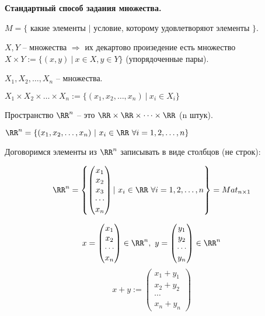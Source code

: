 \bigskip
\textbf{Стандартный способ задания множества.}

\bigskip
$M = \{$ какие элементы $|$ условие, которому удовлетворяют элементы $\}$.

\bigskip
$X, Y$ -- множества $\Rightarrow$ их декартово произедение есть множество $X \times Y := \{ (x, y) \ | \ x \in X, y \in Y\}$ (упорядоченные пары).

$X_1, X_2, \dots, X_n$ -- множества.

$X_1 \times X_2 \times \dots \times X_n := \{(x_1, x_2, \dots, x_n) \ | \ x_i \in X_i\}$

Пространство $\RR^n$ -- это $\RR \times \RR \times \cdots \times \RR$ (n штук).

$\RR^n = \{ (x_1, x_2, \dots, x_n) \ | \ x_i \in \RR \  \forall i = 1, 2, \dots, n \}$

\bigskip
Договоримся элементы из $\RR^n$ записывать в виде столбцов (не строк):

\begin{equation*} \RR^n = \left\{ \begin{pmatrix}
    x_1 \\
    x_2 \\
    x_3 \\
    \cdots \\
    x_n
	\end{pmatrix} | \ x_i \in \RR \ \forall i = 1, 2, \dots , n \right\} = Mat_{n \times 1}
\end{equation*}

\begin{equation*}x = \begin{pmatrix}
x_1 \\
x_2 \\
\cdots \\
x_n
\end{pmatrix} \in \RR^n, \ y = \begin{pmatrix}
y_1 \\
y_2 \\
\cdots \\
y_n
\end{pmatrix} \in \RR^n \end{equation*}
\begin{equation*}x+y:= \begin{pmatrix}
x_1 + y_1 \\
x_2 + y_2 \\
\cdots \\
x_n + y_n
\end{pmatrix}
\end{equation*}

